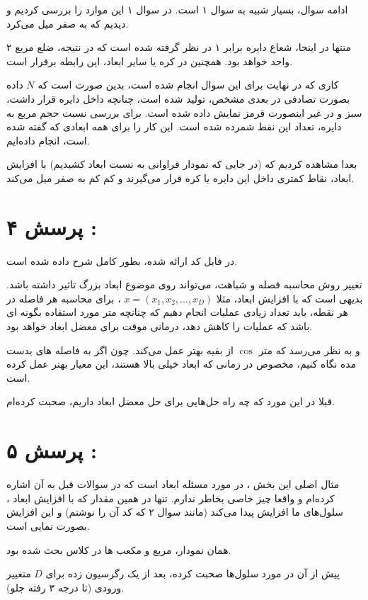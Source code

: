 \documentclass[a4paper, 12pt]{article}
\begin{document}
 ادامه سوال، بسیار شبیه به سوال ۱ است. در سوال ۱ این موارد را بررسی کردیم و دیدیم که به صفر میل می‌کرد.
 
 منتها در اینجا، شعاع دایره برابر ۱ در نظر گرفته شده است که در نتیجه، ضلع مربع ۲ واحد خواهد بود. همچنین در کره یا سایر ابعاد، این رابطه برقرار است.
 
 
 کاری که در نهایت برای این سوال انجام شده است، بدین صورت است که $N$ داده بصورت تصادفی در بعدی مشخص، تولید شده است، چنانچه داخل دایره قرار داشت، سبز و در غیر اینصورت قرمز نمایش داده شده است. برای بررسی نسبت حجم مربع به دایره، تعداد این نقط شمرده شده است. این کار را برای همه ابعادی که گفته شده است، انجام داده‌ایم.
 
 بعدا مشاهده کردیم که (در جایی که نمودار فراوانی به نسبت ابعاد کشیدیم) با افزایش ابعاد، نقاط کمتری داخل این دایره یا کره قرار می‌گیرند و کم کم به صفر میل می‌کند. 

\section*{پرسش ۴ : }

در فایل کد ارائه شده، بطور کامل شرح داده شده است.

تغییر روش محاسبه فصله و شباهت، می‌تواند روی موضوع 
ابعاد بزرگ تاثیر داشته باشد. بدیهی است که با افزایش ابعاد، مثلا 
$x = (x_1,x_2,\dots,x_D)$
، برای محاسبه هر فاصله در هر نقطه، باید تعداد زیادی عملیات انجام دهیم که چنانچه متر مورد استفاده بگونه ای باشد که عملیات را کاهش دهد، درمانی موقت برای معضل ابعاد خواهد بود. 


و به نظر می‌رسد که متر 
$\cos$
از بقیه بهتر عمل می‌کند. چون اگر به فاصله های بدست مده نگاه کنیم، مخصوص در زمانی که ابعاد خیلی بالا هستند، این معیار بهتر عمل کرده است.

قبلا در این مورد که چه راه حل‌هایی برای حل معضل ابعاد داریم، صحبت کرده‌ام.


\section*{پرسش ۵ : }

مثال اصلی این بخش ، در مورد مسئله ابعاد است که در سوالات قبل به آن اشاره کرده‌ام و واقعا چیز خاصی بخاطر ندارم. تنها در همین مقدار که با افزایش ابعاد ، سلول‌های ما افزایش پیدا می‌کند (مانند سوال ۲ که کد آن را نوشتم) و این افزایش بصورت نمایی است. 

همان نمودار، مربع و مکعب ها در کلاس بحث شده بود.

پیش از آن در مورد سلول‌ها صحبت کرده، بعد از یک رگرسیون زده برای 
$D$
متغییر ورودی (تا درجه ۳ رفته جلو). 
\end{document}
